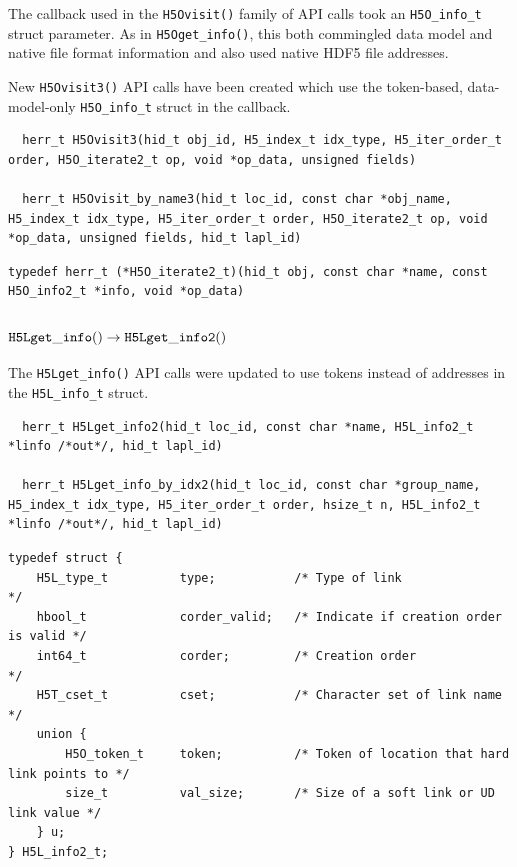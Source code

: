 The callback used in the {\tt H5Ovisit()} family of API calls took an {\tt H5O\_info\_t}
struct parameter. As in {\tt H5Oget\_info()}, this both commingled data model and
native file format information and also used native HDF5 file addresses.

New {\tt H5Ovisit3()} API calls have been created which use the token-based,
data-model-only {\tt H5O\_info\_t} struct in the callback.

\begin{lstlisting}
  herr_t H5Ovisit3(hid_t obj_id, H5_index_t idx_type, H5_iter_order_t order, H5O_iterate2_t op, void *op_data, unsigned fields)

  herr_t H5Ovisit_by_name3(hid_t loc_id, const char *obj_name, H5_index_t idx_type, H5_iter_order_t order, H5O_iterate2_t op, void *op_data, unsigned fields, hid_t lapl_id)
\end{lstlisting}

\begin{lstlisting}
typedef herr_t (*H5O_iterate2_t)(hid_t obj, const char *name, const H5O_info2_t *info, void *op_data)
\end{lstlisting}


\subsubsection{${\tt H5Lget\_info()} \rightarrow {\tt H5Lget\_info2()}$}

The {\tt H5Lget\_info()} API calls were updated to use tokens instead
of addresses in the {\tt H5L\_info\_t} struct.

\begin{lstlisting}
  herr_t H5Lget_info2(hid_t loc_id, const char *name, H5L_info2_t *linfo /*out*/, hid_t lapl_id)

  herr_t H5Lget_info_by_idx2(hid_t loc_id, const char *group_name, H5_index_t idx_type, H5_iter_order_t order, hsize_t n, H5L_info2_t *linfo /*out*/, hid_t lapl_id)
\end{lstlisting}

\begin{lstlisting}
typedef struct {                                                                 
    H5L_type_t          type;           /* Type of link                   */     
    hbool_t             corder_valid;   /* Indicate if creation order is valid */
    int64_t             corder;         /* Creation order                 */     
    H5T_cset_t          cset;           /* Character set of link name     */     
    union {                                                                      
        H5O_token_t     token;          /* Token of location that hard link points to */
        size_t          val_size;       /* Size of a soft link or UD link value */
    } u;                                                                         
} H5L_info2_t;
\end{lstlisting}


